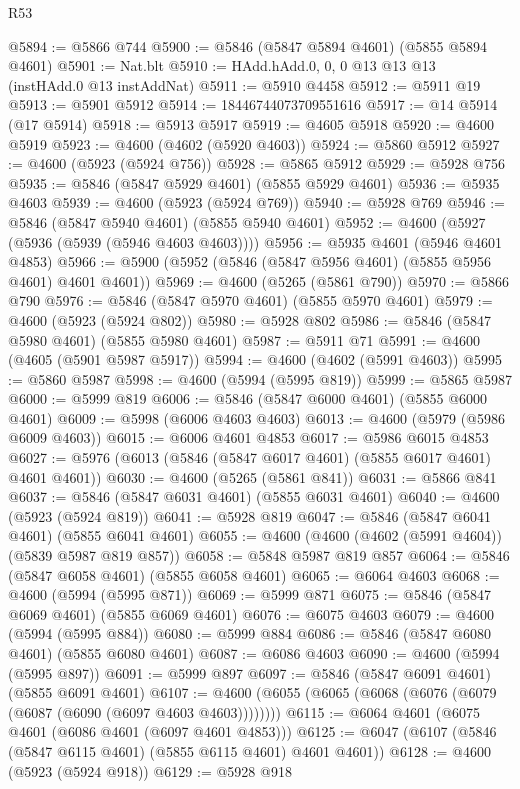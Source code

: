 \begin{lexlean}{R53}
\begin{coremodule}
@5894 := @5866 @744
@5900 := @5846 (@5847 @5894 @4601) (@5855 @5894 @4601)
@5901 := Nat.blt
@5910 := HAdd.hAdd.{0, 0, 0} @13 @13 @13 (instHAdd.{0} @13 instAddNat)
@5911 := @5910 @4458
@5912 := @5911 @19
@5913 := @5901 @5912
@5914 := 18446744073709551616
@5917 := @14 @5914 (@17 @5914)
@5918 := @5913 @5917
@5919 := @4605 @5918
@5920 := @4600 @5919
@5923 := @4600 (@4602 (@5920 @4603))
@5924 := @5860 @5912
@5927 := @4600 (@5923 (@5924 @756))
@5928 := @5865 @5912
@5929 := @5928 @756
@5935 := @5846 (@5847 @5929 @4601) (@5855 @5929 @4601)
@5936 := @5935 @4603
@5939 := @4600 (@5923 (@5924 @769))
@5940 := @5928 @769
@5946 := @5846 (@5847 @5940 @4601) (@5855 @5940 @4601)
@5952 := @4600 (@5927 (@5936 (@5939 (@5946 @4603 @4603))))
@5956 := @5935 @4601 (@5946 @4601 @4853)
@5966 := @5900 (@5952 (@5846 (@5847 @5956 @4601) (@5855 @5956 @4601) @4601 @4601))
@5969 := @4600 (@5265 (@5861 @790))
@5970 := @5866 @790
@5976 := @5846 (@5847 @5970 @4601) (@5855 @5970 @4601)
@5979 := @4600 (@5923 (@5924 @802))
@5980 := @5928 @802
@5986 := @5846 (@5847 @5980 @4601) (@5855 @5980 @4601)
@5987 := @5911 @71
@5991 := @4600 (@4605 (@5901 @5987 @5917))
@5994 := @4600 (@4602 (@5991 @4603))
@5995 := @5860 @5987
@5998 := @4600 (@5994 (@5995 @819))
@5999 := @5865 @5987
@6000 := @5999 @819
@6006 := @5846 (@5847 @6000 @4601) (@5855 @6000 @4601)
@6009 := @5998 (@6006 @4603 @4603)
@6013 := @4600 (@5979 (@5986 @6009 @4603))
@6015 := @6006 @4601 @4853
@6017 := @5986 @6015 @4853
@6027 := @5976 (@6013 (@5846 (@5847 @6017 @4601) (@5855 @6017 @4601) @4601 @4601))
@6030 := @4600 (@5265 (@5861 @841))
@6031 := @5866 @841
@6037 := @5846 (@5847 @6031 @4601) (@5855 @6031 @4601)
@6040 := @4600 (@5923 (@5924 @819))
@6041 := @5928 @819
@6047 := @5846 (@5847 @6041 @4601) (@5855 @6041 @4601)
@6055 := @4600 (@4600 (@4602 (@5991 @4604)) (@5839 @5987 @819 @857))
@6058 := @5848 @5987 @819 @857
@6064 := @5846 (@5847 @6058 @4601) (@5855 @6058 @4601)
@6065 := @6064 @4603
@6068 := @4600 (@5994 (@5995 @871))
@6069 := @5999 @871
@6075 := @5846 (@5847 @6069 @4601) (@5855 @6069 @4601)
@6076 := @6075 @4603
@6079 := @4600 (@5994 (@5995 @884))
@6080 := @5999 @884
@6086 := @5846 (@5847 @6080 @4601) (@5855 @6080 @4601)
@6087 := @6086 @4603
@6090 := @4600 (@5994 (@5995 @897))
@6091 := @5999 @897
@6097 := @5846 (@5847 @6091 @4601) (@5855 @6091 @4601)
@6107 := @4600 (@6055 (@6065 (@6068 (@6076 (@6079 (@6087 (@6090 (@6097 @4603 @4603))))))))
@6115 := @6064 @4601 (@6075 @4601 (@6086 @4601 (@6097 @4601 @4853)))
@6125 := @6047 (@6107 (@5846 (@5847 @6115 @4601) (@5855 @6115 @4601) @4601 @4601))
@6128 := @4600 (@5923 (@5924 @918))
@6129 := @5928 @918

\end{coremodule}
\end{lexlean}
